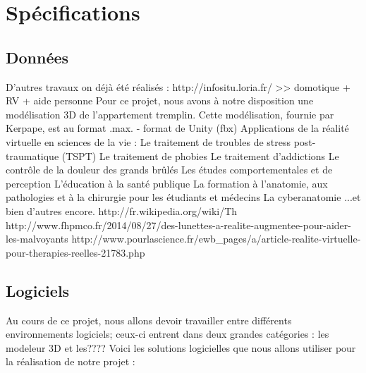 \section{Sp\'ecifications}

\subsection{Donn\'ees}
	D’autres travaux on déjà été réalisés : http://infositu.loria.fr/ >> domotique + RV + aide personne
	Pour ce projet, nous avons à notre disposition une modélisation 3D de l’appartement tremplin. Cette modélisation, fournie par Kerpape, est au format .max.
	- format de Unity (fbx)
	Applications de la réalité virtuelle en sciences de la vie :
	Le traitement de troubles de stress post-traumatique (TSPT)
	Le traitement de phobies
	Le traitement d'addictions
	Le contrôle de la douleur des grands brûlés
	Les études comportementales et de perception
	L'éducation à la santé publique
	La formation à l'anatomie, aux pathologies et à la chirurgie pour les étudiants et médecins
	La cyberanatomie
	...et bien d'autres encore.
	http://fr.wikipedia.org/wiki/Th%
	http://www.fhpmco.fr/2014/08/27/des-lunettes-a-realite-augmentee-pour-aider-les-malvoyants
	http://www.pourlascience.fr/ewb_pages/a/article-realite-virtuelle-pour-therapies-reelles-21783.php

\subsection{Logiciels}
	Au cours de ce projet, nous allons devoir travailler entre différents environnements logiciels; ceux-ci entrent dans deux grandes catégories : les modeleur 3D et les????
	Voici les solutions logicielles que nous allons utiliser pour la réalisation de notre projet :

